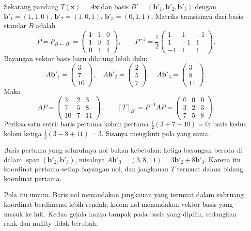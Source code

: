 Sekarang pandang $T(\mathbf{x})=A\mathbf{x}$ dan basis
$B'=(\mathbf{b}'_{1},\mathbf{b}'_{2},\mathbf{b}'_{3})$ dengan
$\mathbf{b}'_{1}=(1,1,0)$, $\mathbf{b}'_{2}=(1,0,1)$, $\mathbf{b}'_{3}=(0,1,1)$. Matriks
transisinya dari basis standar $B$ adalah
\[
  P=P_{B\leftarrow B'}=\begin{pmatrix}1&1&0\\ 1&0&1\\ 0&1&1\end{pmatrix},
  \qquad
  P^{-1}=\frac{1}{2}\begin{pmatrix}1&1&-1\\ 1&-1&1\\ -1&1&1\end{pmatrix}.
\]
Bayangan vektor basis baru dihitung lebih dulu:
\[
  A\mathbf{b}'_{1}=\begin{pmatrix}3\\7\\10\end{pmatrix},\quad
  A\mathbf{b}'_{2}=\begin{pmatrix}2\\5\\7\end{pmatrix},\quad
  A\mathbf{b}'_{3}=\begin{pmatrix}3\\8\\11\end{pmatrix}.
\]
Maka
\[
  AP=\begin{pmatrix}3&2&3\\ 7&5&8\\ 10&7&11\end{pmatrix},
  \qquad
  [T]_{B'}=P^{-1}AP=\begin{pmatrix}0&0&0\\ 3&2&3\\ 7&5&8\end{pmatrix}.
\]
Periksa satu entri: baris pertama kolom pertama $\tfrac{1}{2}(3+7-10)=0$; baris kedua
kolom ketiga $\tfrac{1}{2}(3-8+11)=3$. Sisanya mengikuti pola yang sama.

Baris pertama yang seluruhnya nol bukan kebetulan: ketiga bayangan berada di dalam
$\operatorname{span}(\mathbf{b}'_{2},\mathbf{b}'_{3})$, misalnya
$A\mathbf{b}'_{3}=(3,8,11)=3\mathbf{b}'_{2}+8\mathbf{b}'_{3}$. Karena itu koordinat pertama
setiap bayangan nol, dan jangkauan $T$ termuat dalam bidang koordinat pertama.

Pola itu umum. Baris nol menandakan jangkauan yang termuat dalam subruang koordinat
berdimensi lebih rendah; kolom nol menandakan vektor basis yang masuk ke inti. Kedua gejala
hanya tampak pada basis yang dipilih, sedangkan rank dan nullity tidak berubah.

